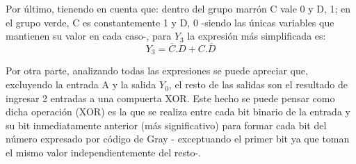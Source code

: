 Por \'ultimo, tienendo en cuenta que: dentro del grupo marr\'on C vale 0 y D, 1; en el grupo verde, C es constantemente 1 y D, 0 -siendo las \'unicas variables que mantienen su valor en cada caso-, para $Y_3$ la expresi\'on m\'as simplificada es: 
 \begin{equation}
 Y_3 = \overline{C}.D
 + C.\overline{D}
     \label{ecy3}
 \end{equation}

\noindent
Por otra parte, analizando todas las expresiones se puede apreciar que, excluyendo la entrada A y la salida $Y_0$, el resto de las salidas son el resultado de ingresar 2 entradas a una compuerta XOR. Este hecho se puede pensar como dicha operaci\'on (XOR) es la que se realiza entre cada bit binario de la entrada y su bit inmediatamente anterior (m\'as significativo) para formar cada bit del n\'umero expresado por c\'odigo de Gray - exceptuando el primer bit ya que toman el mismo valor independientemente del resto-.
